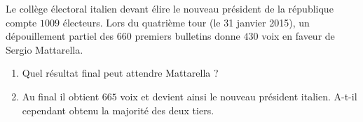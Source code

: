 
\begin{exercice}\label{exo2smath-0127}

    Le collège électoral italien devant élire le nouveau président de la république compte \( 1009\) électeurs. Lors du quatrième tour (le 31 janvier 2015), un dépouillement partiel des \( 660\) premiers bulletins donne \( 430\) voix en faveur de Sergio Mattarella.
    \begin{enumerate}
        \item
            Quel résultat final peut attendre Mattarella ?
        \item
            Au final il obtient \( 665\) voix et devient ainsi le nouveau président italien. A-t-il cependant obtenu la majorité des deux tiers.
    \end{enumerate}

\end{exercice}
